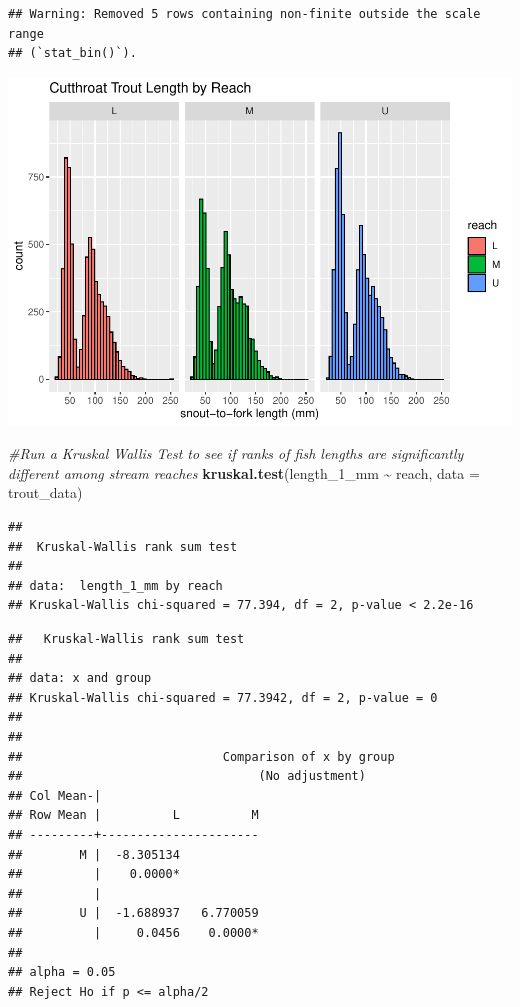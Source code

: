 \documentclass[
]{article}
\newenvironment{Shaded}{\begin{snugshade}}{\end{snugshade}}
\newcommand{\AttributeTok}[1]{\textcolor[rgb]{0.13,0.29,0.53}{#1}}
\newcommand{\CommentTok}[1]{\textcolor[rgb]{0.56,0.35,0.01}{\textit{#1}}}
\newcommand{\FunctionTok}[1]{\textcolor[rgb]{0.13,0.29,0.53}{\textbf{#1}}}
\newcommand{\NormalTok}[1]{#1}
\newcommand{\SpecialCharTok}[1]{\textcolor[rgb]{0.81,0.36,0.00}{\textbf{#1}}}
\begin{document}
\begin{verbatim}
## Warning: Removed 5 rows containing non-finite outside the scale range
## (`stat_bin()`).
\end{verbatim}

\includegraphics{Lab7_Summer.Heschong_files/figure-latex/Kruskal Wallis and Dunn Test-1.pdf}

\begin{Shaded}
\begin{Highlighting}[]
\CommentTok{\#Run a Kruskal Wallis Test to see if ranks of fish lengths are significantly different among stream reaches}
\FunctionTok{kruskal.test}\NormalTok{(length\_1\_mm }\SpecialCharTok{\textasciitilde{}}\NormalTok{ reach, }\AttributeTok{data =}\NormalTok{ trout\_data)}
\end{Highlighting}
\end{Shaded}

\begin{verbatim}
## 
##  Kruskal-Wallis rank sum test
## 
## data:  length_1_mm by reach
## Kruskal-Wallis chi-squared = 77.394, df = 2, p-value < 2.2e-16
\end{verbatim}

\begin{Shaded}
\end{Shaded}

\begin{verbatim}
##   Kruskal-Wallis rank sum test
## 
## data: x and group
## Kruskal-Wallis chi-squared = 77.3942, df = 2, p-value = 0
## 
## 
##                            Comparison of x by group                            
##                                 (No adjustment)                                
## Col Mean-|
## Row Mean |          L          M
## ---------+----------------------
##        M |  -8.305134
##          |    0.0000*
##          |
##        U |  -1.688937   6.770059
##          |     0.0456    0.0000*
## 
## alpha = 0.05
## Reject Ho if p <= alpha/2
\end{verbatim}
\end{document}
